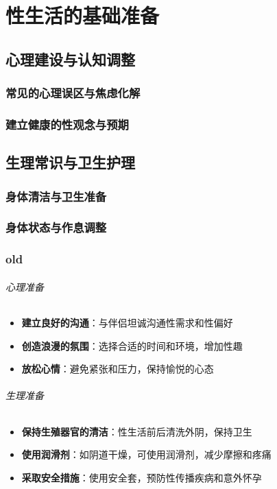 \documentclass[12pt,UTF8]{ctexbook}
\begin{document}
\chapter{性生活的基础准备}

\section{心理建设与认知调整}

\subsection{常见的心理误区与焦虑化解}
\subsection{建立健康的性观念与预期}

\section{生理常识与卫生护理}

\subsection{身体清洁与卫生准备}

\subsection{身体状态与作息调整}

\subsection{old}

\subparagraph{心理准备}

\begin{itemize}
\item \textbf{建立良好的沟通}：与伴侣坦诚沟通性需求和性偏好
\item \textbf{创造浪漫的氛围}：选择合适的时间和环境，增加性趣
\item \textbf{放松心情}：避免紧张和压力，保持愉悦的心态
\end{itemize}

\subparagraph{生理准备}

\begin{itemize}
\item \textbf{保持生殖器官的清洁}：性生活前后清洗外阴，保持卫生
\item \textbf{使用润滑剂}：如阴道干燥，可使用润滑剂，减少摩擦和疼痛
\item \textbf{采取安全措施}：使用安全套，预防性传播疾病和意外怀孕
\end{itemize}
\end{document}
